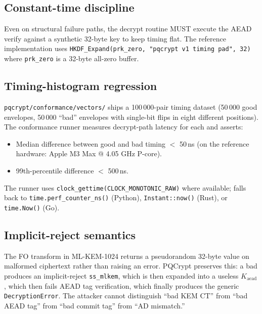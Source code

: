 \subsection{Constant-time discipline}

Even on structural failure paths, the decrypt routine MUST execute the AEAD verify against a synthetic 32-byte key to keep timing flat. The reference implementation uses \texttt{HKDF\_Expand(prk\_zero, "pqcrypt v1 timing pad", 32)} where \texttt{prk\_zero} is a 32-byte all-zero buffer.

\subsection{Timing-histogram regression}

\texttt{pqcrypt/conformance/vectors/} ships a 100\,000-pair timing dataset (50\,000 good envelopes, 50\,000 ``bad'' envelopes with single-bit flips in eight different positions). The conformance runner measures decrypt-path latency for each and asserts:

\begin{itemize}
\item Median difference between good and bad timing $<$ 50\,ns (on the reference hardware: Apple M3 Max @ 4.05 GHz P-core).
\item 99th-percentile difference $<$ 500\,ns.
\end{itemize}

The runner uses \texttt{clock\_gettime(CLOCK\_MONOTONIC\_RAW)} where available; falls back to \texttt{time.perf\_counter\_ns()} (Python), \texttt{Instant::now()} (Rust), or \texttt{time.Now()} (Go).

\subsection{Implicit-reject semantics}

The FO transform in ML-KEM-1024 \citep{fips203,hofheinz2017fo} returns a pseudorandom 32-byte value on malformed ciphertext rather than raising an error. PQCrypt preserves this: a bad  produces an implicit-reject \texttt{ss\_mlkem}, which is then expanded into a useless $K_{\mathrm{aead}}$, which then fails AEAD tag verification, which finally produces the generic \texttt{DecryptionError}. The attacker cannot distinguish ``bad KEM CT'' from ``bad AEAD tag'' from ``bad commit tag'' from ``AD mismatch.''
